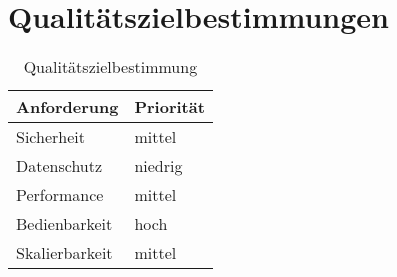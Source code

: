 \chapter{Qualitätszielbestimmungen}
\begin{table}[h]
\centering
\begin{tabular}{l|l}
Anforderung & Priorität \\ \hline
Sicherheit & mittel \\
Datenschutz & niedrig \\
Performance & mittel \\
Bedienbarkeit & hoch \\
Skalierbarkeit & mittel \\
\end{tabular}
\label{tab: quality}
\caption{Qualitätszielbestimmung}
\end{table}
